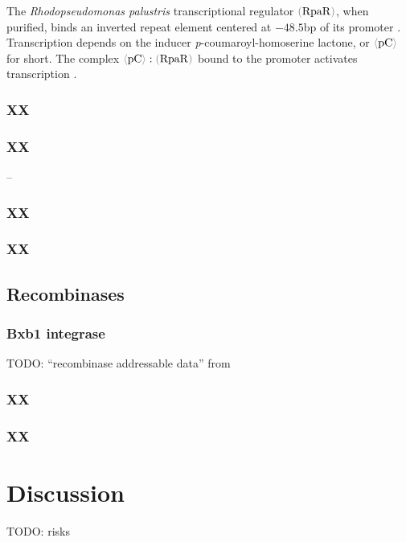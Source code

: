 \documentclass[12pt,notitlepage]{article}
\newcommand{\TODO}[1]{\textrm{\color{red}TODO: #1}}
\newcommand{\cbra}[1]{{\color{gray}\ensuremath{#1}}}
\newcommand{\signal}[1]{\ensuremath{\cbra{\langle}\mathrm{#1}\cbra{\rangle}}}
\newcommand{\protein}[1]{\ensuremath{\cbra{(}\mathrm{#1}\cbra{)}}}
\newcommand{\ra}[1]{{\color{Blue}#1}}
\begin{document}
\ra{
The \emph{Rhodopseudomonas palustris} transcriptional regulator
\protein{RpaR},
when purified,
binds an inverted repeat element 
centered at $-48.5$bp
of its promoter
\cite{HirakawaETAL2011}.
%
%
Transcription depends on 
the inducer 
\emph{p}-coumaroyl-homoserine lactone,
or \signal{pC} for short.
%
%
%
%
The complex 
$\signal{pC} : \protein{RpaR}$
bound to the promoter
activates transcription
\cite[Discussion]{HirakawaETAL2011}.
}


\subsubsection*{XX}



\subsubsection*{XX}

\ra{--}

\subsubsection*{XX}



\subsubsection*{XX}




\subsection{Recombinases}

\subsubsection*{Bxb1 integrase}

\TODO{``recombinase addressable data'' from \cite{BonnetSubsoontornEndy2012}}

\subsubsection*{XX}


\subsubsection*{XX}



\section{Discussion}

\TODO{risks}


\footnotesize



\SHOWTODOS

\leavevmode\vfill{\tiny\color{lightgray}\hfill{\DTMnow}}
\end{document}
